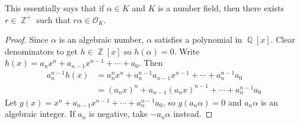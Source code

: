 \documentclass[11pt, a4paper]{memoir}
\DeclareMathOperator{\Q}{{\mathbb{Q}}}
\DeclareMathOperator{\Z}{{\mathbb{Z}}}
\theoremstyle{change}
\theoremstyle{plain}
\theoremstyle{nonumberplain}
\newtheorem{proof}{Proof}
\begin{document}
This essentially says that if $\alpha\in K$ and $K$ is a number field, then there exists $r\in\Z^+$ such that $r\alpha\in\mathcal{O}_K$.
\begin{proof}
    Since $\alpha$ is an algebraic number, $\alpha$ satisfies a polynomial in $\Q[x]$.
    Clear denominators to get $h\in\Z[x]$ so $h(\alpha)=0$.
    Write $h(x)=a_nx^n+a_{n-1}x^{n-1}+\cdots+a_0$.
    Then
    \begin{align*}
        a_n^{n-1}h(x)&=a_n^nx^n+a_n^{n-1}a_{n-1}x^{n-1}+\cdots+a_n^{n-1}a_0\\
                     &= (a_nx)^n+a_{n-1}(a_nx)^{n-1}+\cdots+a_n^{n-1}a_0
    \end{align*}
    Let $g(x)=x^n+a_{n-1}x^{n-1}+\cdots+a_n^{n-1}a_0$, so $g(a_n\alpha)=0$ and $a_n\alpha$ is an algebraic integer.
    If $a_n$ is negative, take $-a_n\alpha$ instead.
\end{proof}
\end{document}
